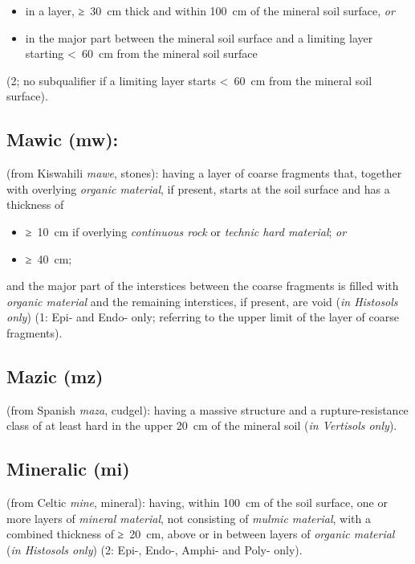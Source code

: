 \documentclass[
  letterpaper,
  DIV=11,
  numbers=noendperiod]{scrreprt}
\providecommand{\tightlist}{%
  \setlength{\itemsep}{0pt}\setlength{\parskip}{0pt}}\usepackage{longtable,booktabs,array}
\begin{document}
\begin{itemize}
\tightlist
\item
  in a layer, ≥~30~cm thick and within 100~cm of the mineral soil
  surface, \emph{or}
\item
  in the major part between the mineral soil surface and a limiting
  layer starting \textless~60~cm from the mineral soil surface
\end{itemize}

(2; no subqualifier if a limiting layer starts \textless~60~cm from the
mineral soil surface).

\hypertarget{mawic-mw}{%
\subsection{Mawic (mw):}\label{mawic-mw}}

(from Kiswahili \emph{mawe}, stones): having a layer of coarse fragments
that, together with overlying \emph{organic material}, if present,
starts at the soil surface and has a thickness of

\begin{itemize}
\tightlist
\item
  ≥~10~cm if overlying \emph{continuous rock} or \emph{technic hard
  material}; \emph{or}
\item
  ≥~40~cm;
\end{itemize}

and the major part of the interstices between the coarse fragments is
filled with \emph{organic material} and the remaining interstices, if
present, are void (\emph{in Histosols only}) (1: Epi- and Endo- only;
referring to the upper limit of the layer of coarse fragments).

\hypertarget{mazic-mz}{%
\subsection{Mazic (mz)}\label{mazic-mz}}

(from Spanish \emph{maza}, cudgel): having a massive structure and a
rupture-resistance class of at least hard in the upper 20~cm of the
mineral soil (\emph{in Vertisols only}).

\hypertarget{mineralic-mi}{%
\subsection{Mineralic (mi)}\label{mineralic-mi}}

(from Celtic \emph{mine}, mineral): having, within 100~cm of the soil
surface, one or more layers of \emph{mineral material}, not consisting
of \emph{mulmic material}, with a combined thickness of ≥~20~cm, above
or in between layers of \emph{organic material} (\emph{in Histosols
only}) (2: Epi-, Endo-, Amphi- and Poly- only).
\end{document}
